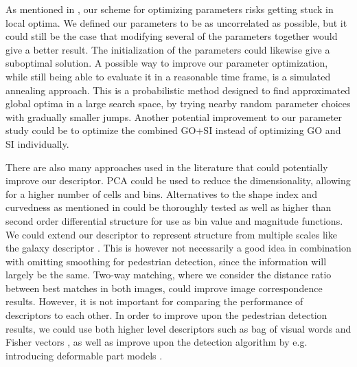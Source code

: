 \documentclass[thesis.tex]{subfiles}
\begin{document}
As mentioned in , our scheme for optimizing parameters risks getting stuck in local optima. We defined our parameters to be as uncorrelated as possible, but it could still be the case that modifying several of the parameters together would give a better result. The initialization of the parameters could likewise give a suboptimal solution. A possible way to improve our parameter optimization, while still being able to evaluate it in a reasonable time frame, is a simulated annealing approach. This is a probabilistic method designed to find approximated global optima in a large search space, by trying nearby random parameter choices with gradually smaller jumps. Another potential improvement to our parameter study could be to optimize the combined GO+SI instead of optimizing GO and SI individually.

There are also many approaches used in the literature that could potentially improve our descriptor. PCA could be used to reduce the dimensionality, allowing for a higher number of cells and bins. Alternatives to the shape index and curvedness as mentioned in  could be thoroughly tested as well as higher than second order differential structure for use as bin value and magnitude functions. We could extend our descriptor to represent structure from multiple scales like the galaxy descriptor . This is however not necessarily a good idea in combination with omitting smoothing for pedestrian detection, since the information will largely be the same. Two-way matching, where we consider the distance ratio between best matches in both images, could improve image correspondence results. However, it is not important for comparing the performance of descriptors to each other. In order to improve upon the pedestrian detection results, we could use both higher level descriptors such as bag of visual words \cite{csurka2004visual} and Fisher vectors \cite{sanchez2013image}, as well as improve upon the detection algorithm by e.g. introducing deformable part models \cite{felzenszwalb2008discriminatively}.

\subbibliography
\end{document}
